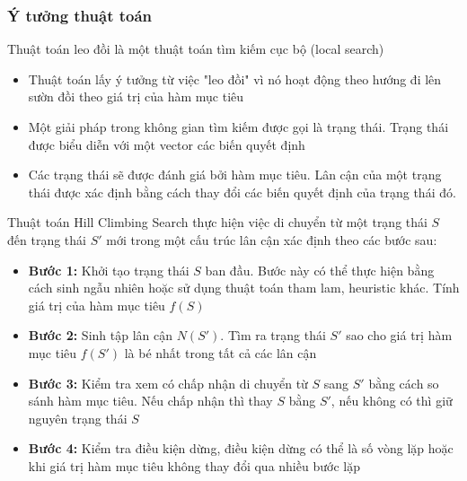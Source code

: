 \documentclass[12pt,a4paper]{article}\author{Nguyễn Nho Dũng}
\begin{document}
\subsubsection{Ý tưởng thuật toán}
Thuật toán leo đồi là một thuật toán tìm kiếm cục bộ (local search)
\begin{itemize}
	\item Thuật toán lấy ý tưởng từ việc "leo đồi" vì nó hoạt động theo hướng đi lên sườn đồi theo giá trị của hàm mục tiêu
	\item Một giải pháp trong không gian tìm kiếm được gọi là trạng thái. Trạng thái được biểu diễn với một vector các biến quyết định
	\item Các trạng thái sẽ được đánh giá bởi hàm mục tiêu. Lân cận của một trạng thái được xác định bằng cách thay đổi các biến quyết định của trạng thái đó.
\end{itemize}
\begin{thuattoan}
	Thuật toán Hill Climbing Search thực hiện việc di chuyển từ một trạng thái $S$ đến trạng thái $S'$ mới trong một cấu trúc lân cận xác định theo các bước sau: 
	\begin{itemize}
		\item \textbf{Bước 1: } Khởi tạo trạng thái $S$ ban đầu. Bước này có thể thực hiện bằng cách sinh ngẫu nhiên hoặc sử dụng thuật toán tham lam, heuristic khác. Tính giá trị của hàm mục tiêu $f(S)$
		\item \textbf{Bước 2: } Sinh tập lân cận $N(S')$. Tìm ra trạng thái $S'$ sao cho giá trị hàm mục tiêu $f(S')$ là bé nhất trong tất cả các lân cận
		\item \textbf{Bước 3: } Kiểm tra xem có chấp nhận di chuyển từ $S$ sang $S'$ bằng cách so sánh hàm mục tiêu. Nếu chấp nhận thì thay $S$ bằng $S'$, nếu không có thì giữ nguyên trạng thái $S$
		\item \textbf{Bước 4: } Kiểm tra điều kiện dừng, điều kiện dừng có thể là số vòng lặp hoặc khi giá trị hàm mục tiêu không thay đổi qua nhiều bước lặp
	\end{itemize}
\end{thuattoan}
\end{document}

